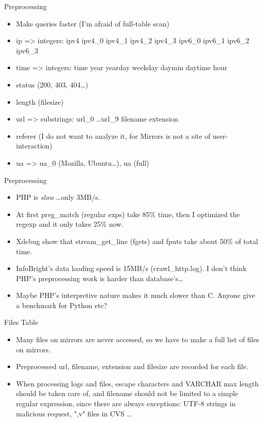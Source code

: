\documentclass{beamer}
\begin{document}
\begin{frame}{Preprocessing}
\begin{itemize}
  \item Make queries faster (I'm afraid of full-table scan)
  \item ip => integers: ipv4 ipv4\_0 ipv4\_1 ipv4\_2 ipv4\_3 ipv6\_0 ipv6\_1 ipv6\_2 ipv6\_3
  \item time => integers: time year yearday weekday daymin daytime hour
  \item status (200, 403, 404\ldots)
  \item length (filesize)
  \item url => substrings: url\_0 \ldots url\_9 filename extension
  \item referer (I do not want to analyze it, for Mirrors is not a site of user-interaction)
  \item ua => ua\_0 (Mozilla, Ubuntu\ldots), ua (full)
\end{itemize}
\end{frame}

\begin{frame}{Preprocessing}
\begin{itemize}
  \item PHP is \emph{slow} \ldots only 3MB/s.
  \item At first preg\_match (regular exps) take 85\% time, then I optimized the regexp and it only takes 25\% now.
  \item Xdebug show that stream\_get\_line (fgets) and fputs take about 50\% of total time.
  \item InfoBright's data loading speed is 15MB/s (crawl\_http.log). I don't think PHP's preprocessing work is harder than database's\ldots
  \item Maybe PHP's interpretive nature makes it much slower than C. Anyone give a benchmark for Python etc?
\end{itemize}
\end{frame}

\begin{frame}{Files Table}
\begin{itemize}
  \item Many files on mirrors are never accessed, so we have to make a full list of files on mirrors.
  \item Preprocessed url, filename, extension and filesize are recorded for each file.
  \item When processing logs and files, escape characters and VARCHAR max length should be taken care of, and filename should not be limited to a simple regular expression, since there are always exceptions: UTF-8 strings in malicious request, ",v" files in CVS \ldots
\end{itemize}
\end{frame}
\end{document}
